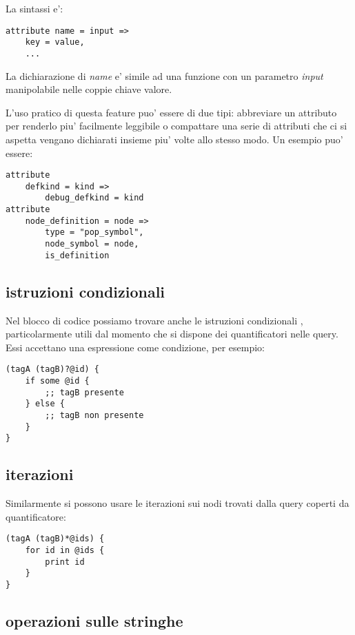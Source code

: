 La sintassi e':

\begin{Verbatim}[samepage=true]
attribute name = input =>
    key = value,
    ...
\end{Verbatim}

La dichiarazione di \emph{name} e' simile ad una funzione con un parametro \emph{input} manipolabile nelle coppie chiave valore.

L'uso pratico di questa feature puo' essere di due tipi: abbreviare un attributo per renderlo piu' facilmente leggibile o compattare una serie di attributi che ci si aspetta vengano dichiarati insieme piu' volte allo stesso modo. Un esempio puo' essere:

\begin{Verbatim}[samepage=true]
attribute
    defkind = kind =>
        debug_defkind = kind
attribute
    node_definition = node =>
        type = "pop_symbol",
        node_symbol = node,
        is_definition
\end{Verbatim}

\subsection{istruzioni condizionali}

Nel blocco di codice possiamo trovare anche le istruzioni condizionali \cite{TreeSitterGraphReferenceConditionals}, particolarmente utili dal momento che si dispone dei quantificatori nelle query.
Essi accettano una espressione come condizione, per esempio:

\begin{Verbatim}[samepage=true]
(tagA (tagB)?@id) {
    if some @id {
        ;; tagB presente
    } else {
        ;; tagB non presente
    }
}
\end{Verbatim}

\subsection{iterazioni}

Similarmente si possono usare le iterazioni \cite{TreeSitterGraphReferenceListIterations} sui nodi trovati dalla query coperti da quantificatore:

\begin{Verbatim}[samepage=true]
(tagA (tagB)*@ids) {
    for id in @ids {
        print id
    }
}
\end{Verbatim}

\subsection{operazioni sulle stringhe}

